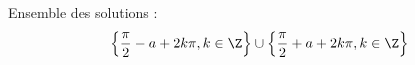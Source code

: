 Ensemble des solutions :
\begin{displaymath}
  \left\lbrace \frac{\pi}{2} - a +2k\pi, k\in \Z\right\rbrace \cup  \left\lbrace \frac{\pi}{2} + a +2k\pi, k\in \Z\right\rbrace
\end{displaymath}

